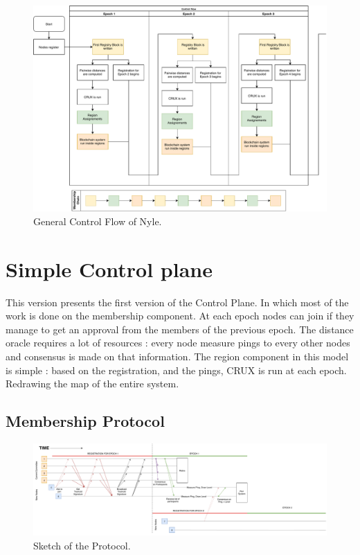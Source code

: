 \documentclass[a4paper,11pt,oneside]{report}
\begin{document}
\begin{figure}[!h] 
\centering
\includegraphics[width=400pt]{figures/Nyle_controlflow}
\caption{General Control Flow of Nyle. }
\label{fig:controlflow}
\end{figure}

\section{Simple Control plane} This version presents the first
version of the Control Plane. In which most of the work is done on the
membership component. At each epoch nodes can join if they manage to get an
approval from the members of the previous epoch. The distance oracle requires a lot of resources : every node measure pings to every other nodes and
consensus is made on that information. The region component in this model is
simple : based on the registration, and the pings, CRUX is run at each
epoch. Redrawing the map of the entire system. 

\subsection{Membership Protocol}

\begin{figure}
\centering
\includegraphics[width=700pt]{figures/Registrationprotocol}
\caption{Sketch of the Protocol.}
\label{fig:registrationprotocol}
\end{figure}
\end{document}
